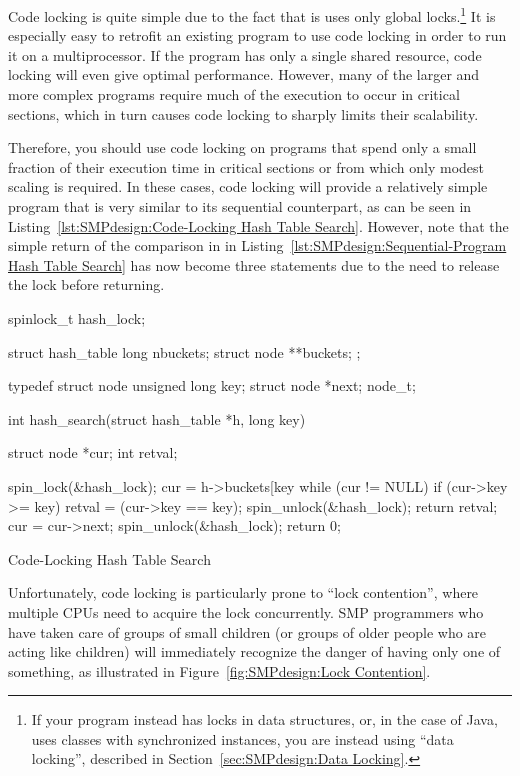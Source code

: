 Code locking is quite simple due to the fact that is uses only
global locks.\footnote{
	If your program instead has locks in data structures,
	or, in the case of Java, uses classes with synchronized
	instances, you are instead using ``data locking'', described
	in Section~\ref{sec:SMPdesign:Data Locking}.}
It is especially
easy to retrofit an existing program to use code locking in
order to run it on a multiprocessor.  If the program has
only a single shared resource, code locking will even give
optimal performance.
However, many of the larger and more complex programs
require much of the execution to
occur in critical sections, which in turn causes code locking
to sharply limits their scalability.

Therefore, you should use code locking on programs that spend
only a small fraction of their execution time in critical sections or
from which only modest scaling is required.  In these cases,
code locking will provide a relatively simple program that is
very similar to its sequential counterpart,
as can be seen in
Listing~\ref{lst:SMPdesign:Code-Locking Hash Table Search}.
However, note that the simple return of the comparison in
 in
Listing~\ref{lst:SMPdesign:Sequential-Program Hash Table Search}
has now become three statements due to the need to release the
lock before returning.

\begin{listing}[tbhp]
\begin{VerbatimL}[commandchars=\\\[\]]
spinlock_t hash_lock;

struct hash_table
{
	long nbuckets;
	struct node **buckets;
};

typedef struct node {
	unsigned long key;
	struct node *next;
} node_t;

int hash_search(struct hash_table *h, long key)
{
	struct node *cur;
	int retval;

	spin_lock(&hash_lock);
	cur = h->buckets[key %
	while (cur != NULL) {
		if (cur->key >= key) {
			retval = (cur->key == key);
			spin_unlock(&hash_lock);
			return retval;
		}
		cur = cur->next;
	}
	spin_unlock(&hash_lock);
	return 0;
}
\end{VerbatimL}
\caption{Code-Locking Hash Table Search}
\label{lst:SMPdesign:Code-Locking Hash Table Search}
\end{listing}

Unfortunately, code locking is particularly prone to ``lock contention'',
where multiple CPUs need to acquire the lock concurrently.
SMP programmers who have taken care of groups of small children
(or groups of older people who are acting like children) will immediately
recognize the danger of having only one of something,
as illustrated in Figure~\ref{fig:SMPdesign:Lock Contention}.

